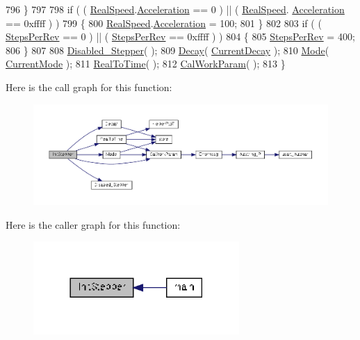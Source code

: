 \begin{DoxyCode}
796     \}
797 
798     \textcolor{keywordflow}{if} ( ( \hyperlink{drv__8825_8c_a2e720ed1ed0ef90dba27c1f246048dcd}{RealSpeed}.\hyperlink{structMotor__Parameters_aa9f1146edc6d945d535eec80a01481f1}{Acceleration} == 0 ) || ( \hyperlink{drv__8825_8c_a2e720ed1ed0ef90dba27c1f246048dcd}{RealSpeed}.
      \hyperlink{structMotor__Parameters_aa9f1146edc6d945d535eec80a01481f1}{Acceleration} == 0xffff ) )
799     \{
800         \hyperlink{drv__8825_8c_a2e720ed1ed0ef90dba27c1f246048dcd}{RealSpeed}.\hyperlink{structMotor__Parameters_aa9f1146edc6d945d535eec80a01481f1}{Acceleration} = 100;
801     \}
802 
803     \textcolor{keywordflow}{if} ( ( \hyperlink{drv__8825_8c_a54128bfe0cfae9cbd8577cf456951f21}{StepsPerRev} == 0 ) || ( \hyperlink{drv__8825_8c_a54128bfe0cfae9cbd8577cf456951f21}{StepsPerRev} == 0xffff ) )
804     \{
805         \hyperlink{drv__8825_8c_a54128bfe0cfae9cbd8577cf456951f21}{StepsPerRev} = 400;
806     \}
807 
808     \hyperlink{group__biba__drv_ga5b763d9479149e1cd8843fa5f144a18a}{Disabled\_Stepper}( );
809     \hyperlink{group__biba__drv_gade0e100f335652e364c58ae4a5c89ba4}{Decay}( \hyperlink{drv__8825_8c_a1cc7e950196402ba79f3e5098b08fa33}{CurrentDecay} );
810     \hyperlink{group__biba__drv_gafe73070875f7ba05536a1eeb83258c91}{Mode}( \hyperlink{drv__8825_8c_ab08e51d202664c8cc9434eac6c46f1f3}{CurrentMode} );
811     \hyperlink{group__biba__drv_gad23127bea36c997c0b1c767f2421db6a}{RealToTime}( );
812     \hyperlink{group__biba__drv_ga3389079a7106f1e741c0bc447dfbcbca}{CalWorkParam}( );
813 \}
\end{DoxyCode}


Here is the call graph for this function\-:
\nopagebreak
\begin{figure}[H]
\begin{center}
\leavevmode
\includegraphics[width=350pt]{group__biba__drv_gad7c735bb7a3e49bba5cb72962f045d10_cgraph}
\end{center}
\end{figure}




Here is the caller graph for this function\-:
\nopagebreak
\begin{figure}[H]
\begin{center}
\leavevmode
\includegraphics[width=222pt]{group__biba__drv_gad7c735bb7a3e49bba5cb72962f045d10_icgraph}
\end{center}
\end{figure}


